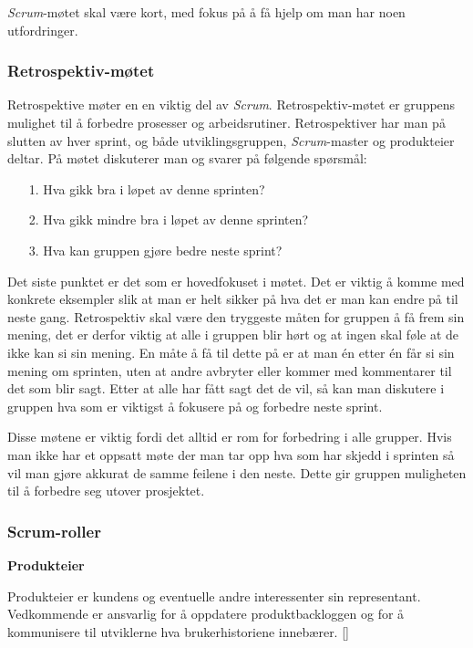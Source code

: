\documentclass[12pt,a4paper,norsk]{article}
\begin{document}
    \textit{Scrum}-møtet skal være kort, med fokus på å få hjelp om man har noen utfordringer.

  \subsubsection{Retrospektiv-møtet}
      Retrospektive møter en en viktig del av \textit{Scrum}. Retrospektiv-møtet er gruppens mulighet til å forbedre prosesser og arbeidsrutiner. Retrospektiver har man på slutten av hver sprint, og både utviklingsgruppen, \textit{Scrum}-master og produkteier deltar. På møtet diskuterer man og svarer på følgende spørsmål:

  \begin{itemize}
        \item[1.] Hva gikk bra i løpet av denne sprinten?
        \item[2.] Hva gikk mindre bra i løpet av denne sprinten?
        \item[3.] Hva kan gruppen gjøre bedre neste sprint?
    \end{itemize}

    Det siste punktet er det som er hovedfokuset i møtet. Det er viktig å komme med konkrete eksempler slik at man er helt sikker på hva det er man kan endre på til neste gang. Retrospektiv skal være den tryggeste måten for gruppen å få frem sin mening, det er derfor viktig at alle i gruppen blir hørt og at ingen skal føle at de ikke kan si sin mening. En måte å få til dette på er at man én etter én får si sin mening om sprinten, uten at andre avbryter eller kommer med kommentarer til det som blir sagt. Etter at alle har fått sagt det de vil, så kan man diskutere i gruppen hva som er viktigst å fokusere på og forbedre neste sprint.

    Disse møtene er viktig fordi det alltid er rom for forbedring i alle grupper. Hvis man ikke har et oppsatt møte der man tar opp hva som har skjedd i sprinten så vil man gjøre akkurat de samme feilene i den neste. Dette gir gruppen muligheten til å forbedre seg utover prosjektet.
    \cite[side 82 - 88]{kniberg}
  \subsubsection{Scrum-roller}\label{subsec:scrumroller}
  \textbf {Produkteier}
    \par Produkteier er kundens og eventuelle andre interessenter sin representant. Vedkommende er ansvarlig for å oppdatere  produktbackloggen og for å kommunisere til utviklerne hva brukerhistoriene innebærer.
    [\cite{scrumguides}]
\end{document}
